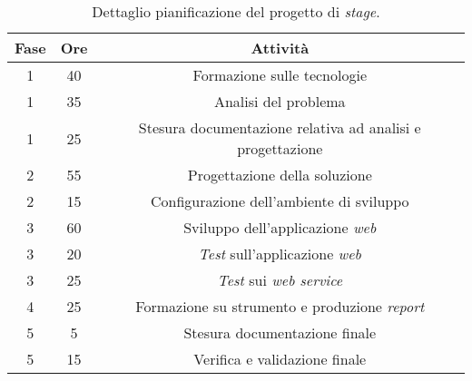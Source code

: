 \begin{center}
	\begin{longtable}{|c|c|c|}
		\caption{Dettaglio pianificazione del progetto di \textit{stage}.}
		\label{table:dettaglio-piano}\\	
		\hline
		\textbf{Fase} & \textbf{Ore} & \textbf{Attività}\\
		\hline
		1 & 40 & Formazione sulle tecnologie\\
		\hline
		1 & 35 & Analisi del problema\\
		\hline
		1 & 25 & Stesura documentazione relativa ad analisi e progettazione\\
		\hline
		2 & 55 & Progettazione della soluzione\\
		\hline
		2 & 15 & Configurazione dell'ambiente di sviluppo\\
		\hline
		3 & 60 & Sviluppo dell'applicazione \textit{web}\\
		\hline
		3 & 20 & \textit{Test} sull'applicazione \textit{web}\\
		\hline
		3 & 25 & \textit{Test} sui \textit{web service}\\
		\hline
		4 & 25 & Formazione su strumento e produzione \textit{report}\\
		\hline
		5 & 5 & Stesura documentazione finale\\
		\hline
		5 & 15 & Verifica e validazione finale\\
		\hline
	\end{longtable}
\end{center}



